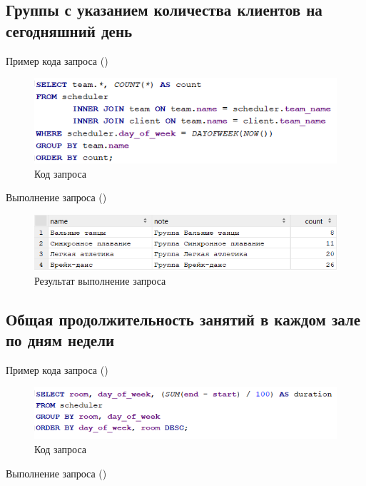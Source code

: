 \documentclass[a4paper,14pt]{article}
\begin{document}
\subsection{Группы с указанием количества клиентов на сегодняшний день}

	Пример кода запроса ()
	
	\begin{figure}[H]
		\centering		
		\includegraphics[width=0.7\linewidth]{image/selectLab_02_04}
		\caption{Код запроса}\label{img:selectLab_02_04}
	\end{figure}
	
	Выполнение запроса ()
	
	\begin{figure}[H]
		\centering		
		\includegraphics[width=0.8\linewidth]{image/selectLab_02_04_Res}
		\caption{Результат выполнение запроса}\label{img:selectLab_02_04_Res}
	\end{figure}	

\subsection{Общая продолжительность занятий в каждом зале по дням недели}

	Пример кода запроса ()
	
	\begin{figure}[H]
		\centering		
		\includegraphics[width=0.7\linewidth]{image/selectLab_02_05}
		\caption{Код запроса}\label{img:selectLab_02_05}
	\end{figure}
	
	Выполнение запроса ()
	
\end{document}
